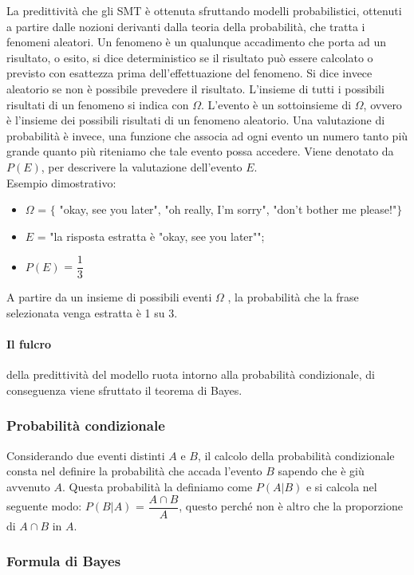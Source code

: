La predittività che gli SMT è ottenuta sfruttando modelli probabilistici, ottenuti a partire dalle nozioni derivanti dalla teoria della probabilità, che tratta i fenomeni aleatori. Un fenomeno è un qualunque accadimento che porta ad un risultato, o esito, si dice deterministico se il risultato può essere calcolato o previsto con esattezza prima dell'effettuazione del fenomeno. Si dice invece aleatorio se non è possibile prevedere il risultato. L'insieme di tutti i possibili risultati di un fenomeno si indica con $\Omega$. L'evento è un sottoinsieme di $\Omega$, ovvero è l'insieme dei possibili risultati di un fenomeno aleatorio. Una valutazione di probabilità è invece, una funzione che associa ad ogni evento un numero tanto più grande quanto più riteniamo che tale evento possa accedere. Viene denotato da $P(E)$, per descrivere la valutazione dell'evento $E$. 
\\
Esempio dimostrativo:
\begin{itemize}
	\item $\Omega$ = $\{$ "okay, see you later", "oh really, I'm sorry", "don't bother me please!"$\}$
	\item $E$ = "la risposta estratta è "okay, see you later"";
	\item $P(E)$ = $\dfrac{1}{3}$ 
\end{itemize}
A partire da un insieme di possibili eventi $\Omega$
, la probabilità che la frase selezionata venga estratta è 1 su 3. 

\paragraph{Il fulcro} della predittività del modello ruota intorno alla probabilità condizionale, di conseguenza viene sfruttato il teorema di Bayes.
\subsubsection{Probabilità condizionale}

Considerando due eventi distinti $A$ e $B$, il calcolo della probabilità condizionale consta nel definire la probabilità che accada l'evento $B$ sapendo che è giù avvenuto $A$. Questa probabilità la definiamo come $P(A|B)$ e si calcola nel seguente modo: 
$P(B|A)$ = $\dfrac{A \cap B}{A}$, questo perché non è altro che la proporzione di $A \cap B$ in $A$.

\subsubsection{Formula di Bayes}

